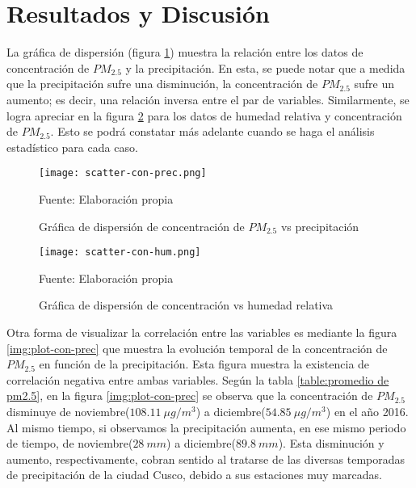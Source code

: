 \documentclass[a4paper,11pt]{article}
\begin{document}
\section{Resultados y Discusión}       


La gráfica de dispersión (figura \ref{img:scatter-con-prec}) muestra la relación entre los datos de concentración de $PM_{2.5}$ y la precipitación. En esta, se puede notar que a medida que la precipitación sufre una disminución, la concentración de $PM_{2.5}$ sufre un aumento; es decir, una relación inversa entre el par de variables. Similarmente, se logra apreciar en la figura \ref{img:scatter-con-hum} para los datos de humedad relativa y concentración de $PM_{2.5}$. Esto se podrá constatar más adelante cuando se haga el análisis estadístico para cada caso.\\

\begin{figure}[H]
	\centering
     \texttt{[image: scatter-con-prec.png]}
	\caption{Gráfica de dispersión de concentración de $PM_{2.5}$ vs precipitación}	
    \label{img:scatter-con-prec}
    
    \centerline{Fuente: Elaboración propia }
\end{figure}

\begin{figure}[H]
	\centering
     \texttt{[image: scatter-con-hum.png]}
	\caption{Gráfica de dispersión de concentración vs humedad relativa}	
    \label{img:scatter-con-hum}
    
    \centerline{Fuente: Elaboración propia }
\end{figure}

Otra forma de visualizar la correlación entre las variables es mediante la figura \ref{img:plot-con-prec} que muestra la evolución temporal de la concentración de $PM_{2.5}$ en función de la precipitación. Esta figura muestra la existencia de correlación negativa entre ambas variables. Según la tabla \ref{table:promedio de pm2.5}, en la figura  \ref{img:plot-con-prec} se observa que la concentración de $PM_{2.5}$ disminuye de noviembre($108.11\ \mu g/m^3$) a diciembre($54.85\ \mu g/m^3$) en el año 2016. Al mismo tiempo, si observamos la precipitación aumenta, en ese mismo periodo de tiempo, de noviembre($28\ mm$) a diciembre($89.8\ mm$). Esta disminución y aumento, respectivamente, cobran sentido al tratarse de las diversas temporadas de precipitación de la ciudad Cusco, debido a sus estaciones muy marcadas.
\end{document}
